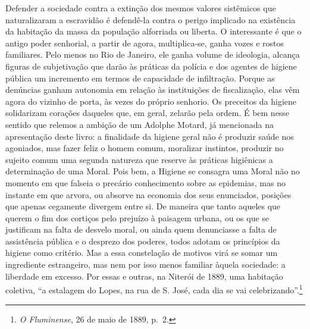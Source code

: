 Defender a sociedade contra a extinção dos mesmos valores sistêmicos que
naturalizaram a escravidão é defendê-la contra o perigo implicado na
existência da habitação da massa da população alforriada ou liberta. O
interessante é que o antigo poder senhorial, a partir de agora,
multiplica-se, ganha vozes e rostos familiares. Pelo menos no Rio de
Janeiro, ele ganha volume de ideologia, alcança figuras de subjetivação
que darão às práticas da polícia e dos agentes de higiene pública um
incremento em termos de capacidade de infiltração. Porque as denúncias
ganham autonomia em relação às instituições de fiscalização, elas vêm
agora do vizinho de porta, às vezes do próprio senhorio. Os preceitos da
higiene solidarizam corações daqueles que, em geral, zelarão pela ordem.
É bem nesse sentido que relemos a ambição de um Adolphe Motard, já
mencionada na apresentação deste livro: a finalidade da higiene geral
não é produzir saúde nos agoniados, mas fazer feliz o homem comum,
moralizar instintos, produzir no sujeito comum uma segunda natureza que
reserve às práticas higiênicas a determinação de uma Moral. Pois bem, a
Higiene se consagra uma Moral não no momento em que falseia o precário
conhecimento sobre as epidemias, mas no instante em que arvora, ou
absorve na economia dos seus enunciados, posições que apenas cegamente
divergem entre si. De maneira que tanto aqueles que querem o fim dos
cortiços pelo prejuízo à paisagem urbana, ou os que se justificam na
falta de desvelo moral, ou ainda quem denunciasse a falta de assistência
pública e o desprezo dos poderes, todos adotam os princípios da higiene
como critério. Mas a essa constelação de motivos virá se somar um
ingrediente estrangeiro, mas nem por isso menos familiar àquela
sociedade: a liberdade em excesso. Por essas e outras, na Niterói de
1889, uma habitação coletiva, ``a estalagem do Lopes, na rua de S. José,
cada dia se vai celebrizando''.\footnote{\emph{O Fluminense}, 26 de maio
  de 1889, p.~2.}

